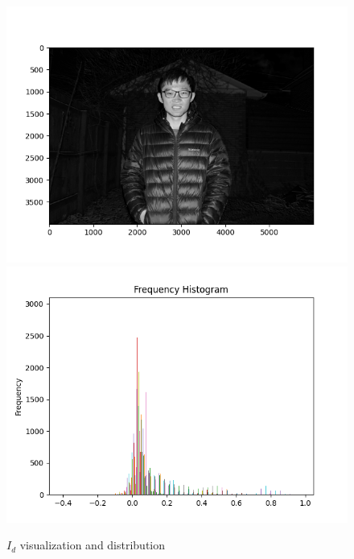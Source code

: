 \documentclass[final]{cvpr}
\begin{document}
\begin{figure}[ht]
   \centering
   \includegraphics[scale=0.5]{../data/output/Arthas_I_diff.png}
   \includegraphics[scale=0.5]{../data/output/idiff_distribution.png}
   \caption{$I_d$ visualization and distribution}
\end{figure}
\end{document}
